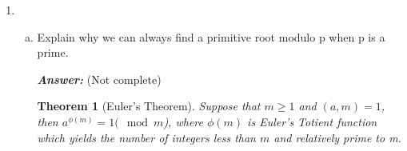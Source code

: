\documentclass[11pt,a4paper,fleqn]{article}
\newtheorem{theorem}{Theorem}
\begin{document}
\begin{enumerate}[1.]
\begin{flushleft}
\begin{lstlisting}[
				style={mystyle},
				caption={Primitve Roots Calculation},
				label={lst:primitive-roots}
				]
					primitive_roots
				}
				
				///
				/// Generates a list of integers less than n and co-prime to n.
				///
				pub fn coprime_nums_less_than_n(n: &BigInt) -> Vec<BigInt> {
					let mut coprimes: Vec<BigInt> = Vec::new();
					let r = range(BigInt::from(1u64), n.clone());
					
					for num in r {
						if n.gcd_euclid(&num) == BigInt::one() {
							coprimes.push(num)
						}
					}
					coprimes.sort();
					coprimes
				}
				
				///
				/// Get list of divisors of a number n > 2
				///
				pub fn divisors_of_n(n: &BigInt) -> Vec<BigInt> {
					let mut divisors: Vec<BigInt> = Vec::new();
					let mut primes = vec![BigInt::from(2u64)];
					let p_factors_n = n.prime_factors(&mut primes);
					let p_factors_n = p_factors_n
					.iter()
					.map(|(p, _)| p.clone())
					.collect::<Vec<BigInt>>();
					
					for p in p_factors_n {
						let mut i = 0;
						loop {
							let pow = p.pow(i);
							if n % &pow == BigInt::zero() {
								divisors.push(n / &pow);
								divisors.push(pow);
								i += 1;
							} else {
								break;
							}
						}
					}
					divisors.sort();
					divisors.dedup();
					divisors
				}
			\end{lstlisting}
			
		\end{flushleft}
		\item 
		\begin{enumerate}[a.]
			\item Explain why we can always find a primitive root modulo p when p is a prime.
			\bigskip
			\begin{flushleft}
				\textbf{\textit{Answer:}} (Not complete)
				\begin{theorem}[Euler's Theorem]
					\label{eulers_thm}
					Suppose that $m \ge 1$ and $(a, m) = 1$, then $a^{\phi(m)} = 1 (\mod m$), where $\phi(m)$ is Euler's Totient function which yields the number of integers less than $m$ and relatively prime to m.
				\end{theorem}
				

\end{flushleft}
\end{enumerate}
\end{enumerate}
\end{document}
